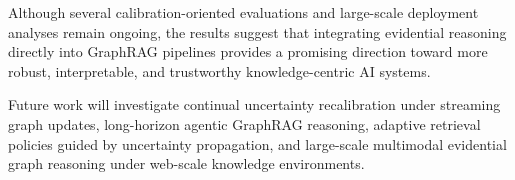 \documentclass[sigconf,review,anonymous]{acmart}
\begin{document}
Although several calibration-oriented evaluations and large-scale deployment analyses remain ongoing, the results suggest that integrating evidential reasoning directly into GraphRAG pipelines provides a promising direction toward more robust, interpretable, and trustworthy knowledge-centric AI systems.

Future work will investigate continual uncertainty recalibration under streaming graph updates, long-horizon agentic GraphRAG reasoning, adaptive retrieval policies guided by uncertainty propagation, and large-scale multimodal evidential graph reasoning under web-scale knowledge environments.




\end{document}
